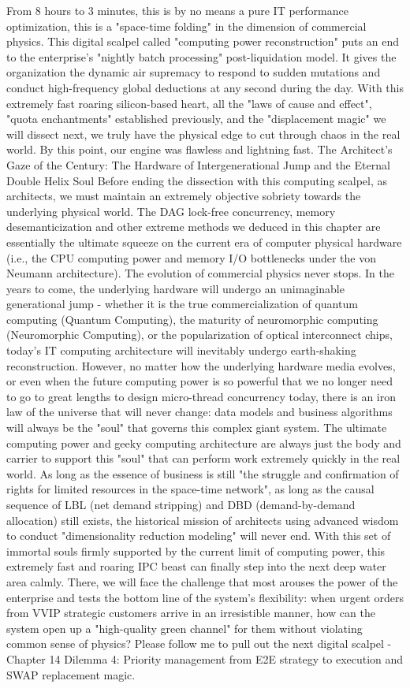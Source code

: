 \documentclass[11pt,a4paper]{article}
\begin{document}
From 8 hours to 3 minutes, this is by no means a pure IT performance optimization, this is a "space-time folding" in the dimension of commercial physics. This digital scalpel called "computing power reconstruction" puts an end to the enterprise's "nightly batch processing" post-liquidation model. It gives the organization the dynamic air supremacy to respond to sudden mutations and conduct high-frequency global deductions at any second during the day. With this extremely fast roaring silicon-based heart, all the "laws of cause and effect", "quota enchantments" established previously, and the "displacement magic" we will dissect next, we truly have the physical edge to cut through chaos in the real world. By this point, our engine was flawless and lightning fast. The Architect’s Gaze of the Century: The Hardware of Intergenerational Jump and the Eternal Double Helix Soul Before ending the dissection with this computing scalpel, as architects, we must maintain an extremely objective sobriety towards the underlying physical world. The DAG lock-free concurrency, memory desemanticization and other extreme methods we deduced in this chapter are essentially the ultimate squeeze on the current era of computer physical hardware (i.e., the CPU computing power and memory I/O bottlenecks under the von Neumann architecture). The evolution of commercial physics never stops. In the years to come, the underlying hardware will undergo an unimaginable generational jump - whether it is the true commercialization of quantum computing (Quantum Computing), the maturity of neuromorphic computing (Neuromorphic Computing), or the popularization of optical interconnect chips, today's IT computing architecture will inevitably undergo earth-shaking reconstruction. However, no matter how the underlying hardware media evolves, or even when the future computing power is so powerful that we no longer need to go to great lengths to design micro-thread concurrency today, there is an iron law of the universe that will never change: data models and business algorithms will always be the "soul" that governs this complex giant system. The ultimate computing power and geeky computing architecture are always just the body and carrier to support this "soul" that can perform work extremely quickly in the real world. As long as the essence of business is still "the struggle and confirmation of rights for limited resources in the space-time network", as long as the causal sequence of LBL (net demand stripping) and DBD (demand-by-demand allocation) still exists, the historical mission of architects using advanced wisdom to conduct "dimensionality reduction modeling" will never end. With this set of immortal souls firmly supported by the current limit of computing power, this extremely fast and roaring IPC beast can finally step into the next deep water area calmly. There, we will face the challenge that most arouses the power of the enterprise and tests the bottom line of the system's flexibility: when urgent orders from VVIP strategic customers arrive in an irresistible manner, how can the system open up a "high-quality green channel" for them without violating common sense of physics? Please follow me to pull out the next digital scalpel - Chapter 14 Dilemma 4: Priority management from E2E strategy to execution and SWAP replacement magic.
\end{document}
